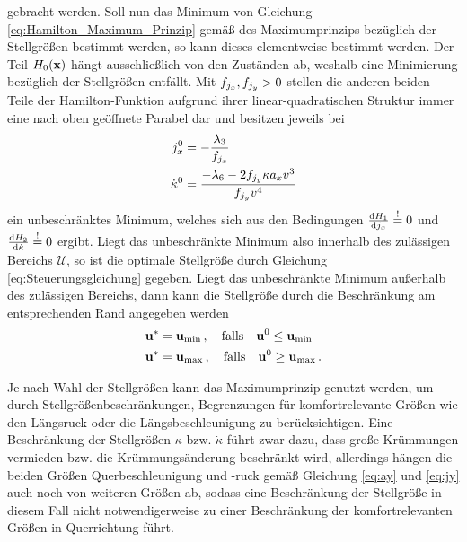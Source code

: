 gebracht werden. Soll nun das Minimum von Gleichung \eqref{eq:Hamilton_Maximum_Prinzip} gemäß des Maximumprinzips bezüglich der Stellgrößen bestimmt werden, so kann dieses elementweise bestimmt werden. Der Teil $H_0(\boldsymbol{\mathrm{x}})$ hängt ausschließlich von den Zuständen ab, weshalb eine Minimierung bezüglich der Stellgrößen entfällt. Mit $f_{j_x},f_{j_y} > 0$ stellen die anderen beiden Teile der Hamilton-Funktion aufgrund ihrer linear-quadratischen Struktur immer eine nach oben geöffnete Parabel dar und besitzen jeweils bei 
\begin{align}
	j_x^0 &= -\frac{\lambda_3}{f_{j_x}}  \\
	\dot{\kappa}^0 &= \frac{-\lambda_6-2f_{j_y} \kappa a_xv^3}{f_{j_y} v^4} 
\end{align}
ein unbeschränktes Minimum, welches sich aus den Bedingungen $\frac{\textrm{d}{H_1}}{\textrm{d}{j_x}}\stackrel{!}{=}0$ und $\frac{\textrm{d}{H_2}}{\textrm{d}{\dot{\kappa}}}\stackrel{!}{=}0$ ergibt. Liegt das unbeschränkte Minimum also innerhalb des zulässigen Bereichs $\mathcal{U}$, so ist die optimale Stellgröße durch Gleichung \eqref{eq:Steuerungsgleichung} gegeben. Liegt das unbeschränkte Minimum außerhalb des zulässigen Bereichs, dann kann die Stellgröße durch die Beschränkung am entsprechenden Rand angegeben werden \begin{align}
	\boldsymbol{\mathrm{u}}^* &= \boldsymbol{\mathrm{u}}_{\textrm{min}}\,,\quad \textrm{falls}\quad \boldsymbol{\mathrm{u}}^0 \leq \boldsymbol{\mathrm{u}}_{\textrm{min}} \\
	\boldsymbol{\mathrm{u}}^* &= \boldsymbol{\mathrm{u}}_{\textrm{max}}\,,\quad \textrm{falls}\quad \boldsymbol{\mathrm{u}}^0 \geq \boldsymbol{\mathrm{u}}_{\textrm{max}} \,.
\end{align} 

Je nach Wahl der Stellgrößen kann das Maximumprinzip genutzt werden, um durch Stellgrößenbeschränkungen, Begrenzungen für komfortrelevante Größen wie den Längsruck oder die Längsbeschleunigung zu berücksichtigen. Eine Beschränkung der Stellgrößen $\kappa$ bzw. $\dot{\kappa}$ führt zwar dazu, dass große Krümmungen vermieden bzw. die Krümmungsänderung beschränkt wird, allerdings hängen die beiden Größen Querbeschleunigung und -ruck gemäß Gleichung \eqref{eq:ay} und \eqref{eq:jy} auch noch von weiteren Größen ab, sodass eine Beschränkung der Stellgröße in diesem Fall nicht notwendigerweise zu einer Beschränkung der komfortrelevanten Größen in Querrichtung führt. 